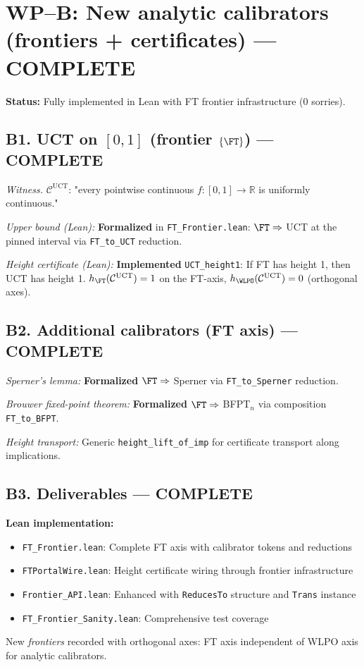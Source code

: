 \section{WP–B: New analytic calibrators (frontiers + certificates) — \textbf{\color{green}COMPLETE}}

\textbf{Status:} Fully implemented in Lean with FT frontier infrastructure (0 sorries).

\subsection{B1. UCT on \([0,1]\) (frontier $\{\FT\}$) — \textbf{\color{green}COMPLETE}}
\emph{Witness.} $\mathcal C^{\mathrm{UCT}}$: "every pointwise continuous $f:[0,1]\to\mathbb R$ is uniformly continuous."

\emph{Upper bound (Lean):} \textbf{\color{green}Formalized} in \texttt{FT\_Frontier.lean}: \(\FT\Rightarrow\) UCT at the pinned interval via \texttt{FT\_to\_UCT} reduction.

\emph{Height certificate (Lean):} \textbf{\color{green}Implemented} \texttt{UCT\_height1}: If FT has height 1, then UCT has height 1.
\(h_{\FT}(\mathcal C^{\mathrm{UCT}})=1\) on the FT-axis, \(h_{\WLPO}(\mathcal C^{\mathrm{UCT}})=0\) (orthogonal axes).

\subsection{B2. Additional calibrators (FT axis) — \textbf{\color{green}COMPLETE}}
\emph{Sperner's lemma:} \textbf{\color{green}Formalized} \(\FT\Rightarrow\) Sperner via \texttt{FT\_to\_Sperner} reduction.

\emph{Brouwer fixed-point theorem:} \textbf{\color{green}Formalized} \(\FT\Rightarrow\) BFPT$_n$ via composition \texttt{FT\_to\_BFPT}.

\emph{Height transport:} Generic \texttt{height\_lift\_of\_imp} for certificate transport along implications.

\subsection{B3. Deliverables — \textbf{\color{green}COMPLETE}}
\textbf{Lean implementation:}
\begin{itemize}
\item \texttt{FT\_Frontier.lean}: Complete FT axis with calibrator tokens and reductions
\item \texttt{FTPortalWire.lean}: Height certificate wiring through frontier infrastructure  
\item \texttt{Frontier\_API.lean}: Enhanced with \texttt{ReducesTo} structure and \texttt{Trans} instance
\item \texttt{FT\_Frontier\_Sanity.lean}: Comprehensive test coverage
\end{itemize}
New \emph{frontiers} recorded with orthogonal axes: FT axis independent of WLPO axis for analytic calibrators.